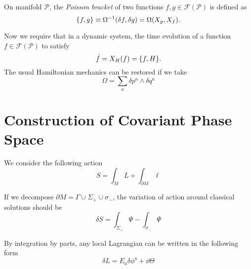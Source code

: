 \documentclass[10pt]{article}
\begin{document}
\begin{definition}
    On manifold $\mathcal{P}$, the \textit{Poisson bracket} of two functions  $f,g\in\mathcal{F}(\mathcal{P})$ is defined as
    \begin{equation}
        \pb{f}{g}\equiv\Omega^{-1}(\delta f,\delta g)=\Omega(X_g,X_f).
    \end{equation}
\end{definition}
Now we require that in a dynamic system, the time evolution of a function $f\in\mathcal{F}(\mathcal{P})$ to satisfy
\begin{equation}
    \dot{f}=X_H(f)=\pb{f}{H}.
\end{equation}
The usual Hamiltonian mechanics can be restored if we take
\begin{equation}
    \Omega=\sum_a \delta p^a\wedge \delta q^a
\end{equation}

\section{Construction of Covariant Phase Space}
We consider the following action
\begin{equation}
    S=\int_M L+\int_{\partial M}\ell\label{eq:action}
\end{equation}

If we decompose $\partial M=\Gamma\cup\Sigma_+\cup\sigma_-$, the variation of action around classical solutions should be
\begin{equation}
    \delta S=\int_{\Sigma_+}\Psi-\int_{\sigma_-}\Psi\label{var_S_1}
\end{equation}

By integration by parts, any local Lagrangian can be written in the following form
\begin{equation}
    \delta L=E_a\delta \phi^a+\dd{\Theta}
\end{equation}
\end{document}
